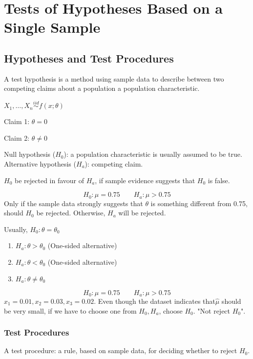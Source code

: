 \chapter{Tests of Hypotheses Based on a Single Sample}
\section{Hypotheses and Test Procedures}
A test hypothesis is a method using sample data to describe between two competing claims about a population a population characteristic.

\begin{exmp}
$X_1,\dots,X_n \overset{iid}{\sim} f(x;\theta)$

Claim 1: $\theta=0$

Claim 2: $\theta\neq 0$
\end{exmp}

\begin{defn}
Null hypothesis ($H_0$): a population characteristic is usually assumed to be true. Alternative hypothesis ($H_a$): competing claim.

$H_0$ be rejected in favour of $H_a$, if sample evidence suggests that $H_0$ is false.
\end{defn}

\begin{exmp}
\[H_0:\mu=0.75 \qquad H_a:\mu>0.75\]
Only if the sample data strongly suggests that $\theta$ is something different from 0.75, should $H_0$ be rejected. Otherwise, $H_a$ will be rejected.
\end{exmp}

Usually, $H_0:\theta=\theta_0$
\begin{enumerate}
\item $H_a:\theta > \theta_0$ (One-sided alternative)
\item $H_a:\theta <\theta_0$ (One-sided alternative)
\item $H_a:\theta \neq \theta_0$
\end{enumerate}

\begin{exmp}
\[H_0:\mu=0.75 \qquad H_a:\mu>0.75\]
$x_1=0.01,x_2=0.03,x_3=0.02$. Even though the dataset indicates that$\hat{\mu}$ should be very small, if we have to choose one from $H_0,H_a$, choose $H_0$. "Not reject $H_0$".
\end{exmp}


\subsection{Test Procedures}
A test procedure: a rule, based on sample data, for deciding whether to reject $H_0$.

